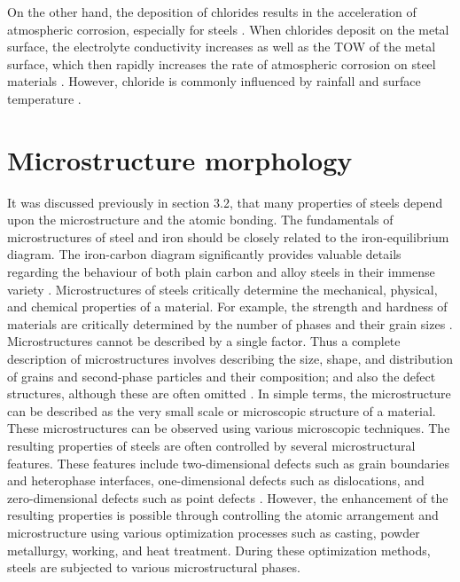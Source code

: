 \documentclass[12pt]{report}
\begin{document}
On the other hand, the deposition of chlorides results in the acceleration of atmospheric corrosion, especially for steels \cite{islam2018effects}. When chlorides deposit on the metal surface, the electrolyte conductivity increases as well as the TOW of the metal surface, which then rapidly increases the rate of atmospheric corrosion on steel materials \cite{marzorati2018green}. However, chloride is commonly influenced by rainfall and surface temperature \cite{cai2018influence}.

\section{Microstructure morphology} 
It was discussed previously in section 3.2, that many properties of steels depend upon the microstructure and the atomic bonding. The fundamentals of microstructures of steel and iron should be closely related to the iron-equilibrium diagram. The iron-carbon diagram significantly provides valuable details regarding the behaviour of both plain carbon and alloy steels in their immense variety \cite{bhadeshia2017steels}. 
Microstructures of steels critically determine the mechanical, physical, and chemical properties of a material. For example, the strength and hardness of materials are critically determined by the number of phases and their grain sizes \cite{clemens2017microstructure}. Microstructures cannot be described by a single factor. Thus a complete description of microstructures involves describing the size, shape, and distribution of grains and second-phase particles and their composition; and also the defect structures, although these are often omitted \cite{suryanarayana2017microstructure}. In simple terms, the microstructure can be described as the very small scale or microscopic structure of a material. These microstructures can be observed using various microscopic techniques.  
The resulting properties of steels are often controlled by several microstructural features. These features include two-dimensional defects such as grain boundaries and heterophase interfaces, one-dimensional defects such as dislocations, and zero-dimensional defects such as point defects \cite{clemens2017microstructure}. However, the enhancement of the resulting properties is possible through controlling the atomic arrangement and microstructure using various optimization processes such as casting, powder metallurgy, working, and heat treatment. During these optimization methods, steels are subjected to various microstructural phases.
\end{document}
